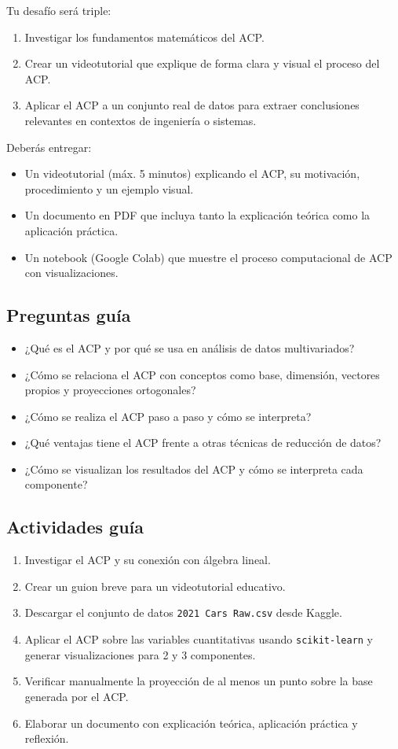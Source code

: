 \documentclass[a4,11pt]{aleph-notas}
\begin{document}
Tu desafío será triple: 
\begin{enumerate}[leftmargin=*]
\item Investigar los fundamentos matemáticos del ACP.
\item Crear un videotutorial que explique de forma clara y visual el proceso del ACP.
\item Aplicar el ACP a un conjunto real de datos para extraer conclusiones relevantes en contextos de ingeniería o sistemas.
\end{enumerate}

Deberás entregar:
\begin{itemize}[leftmargin=*]
\item Un videotutorial (máx. 5 minutos) explicando el ACP, su motivación, procedimiento y un ejemplo visual.
\item Un documento en PDF que incluya tanto la explicación teórica como la aplicación práctica.
\item Un notebook (Google Colab) que muestre el proceso computacional de ACP con visualizaciones.
\end{itemize}

\subsection*{Preguntas guía}
\begin{itemize}[leftmargin=*]
\item ¿Qué es el ACP y por qué se usa en análisis de datos multivariados?
\item ¿Cómo se relaciona el ACP con conceptos como base, dimensión, vectores propios y proyecciones ortogonales?
\item ¿Cómo se realiza el ACP paso a paso y cómo se interpreta?
\item ¿Qué ventajas tiene el ACP frente a otras técnicas de reducción de datos?
\item ¿Cómo se visualizan los resultados del ACP y cómo se interpreta cada componente?
\end{itemize}

\subsection*{Actividades guía}
\begin{enumerate}[leftmargin=*, label={{\arabic*.}}]
\item Investigar el ACP y su conexión con álgebra lineal.
\item Crear un guion breve para un videotutorial educativo.
\item Descargar el conjunto de datos \texttt{2021 Cars Raw.csv} desde Kaggle.
\item Aplicar el ACP sobre las variables cuantitativas usando \texttt{scikit-learn} y generar visualizaciones para 2 y 3 componentes.
\item Verificar manualmente la proyección de al menos un punto sobre la base generada por el ACP.
\item Elaborar un documento con explicación teórica, aplicación práctica y reflexión.
\end{enumerate}
\end{document}
